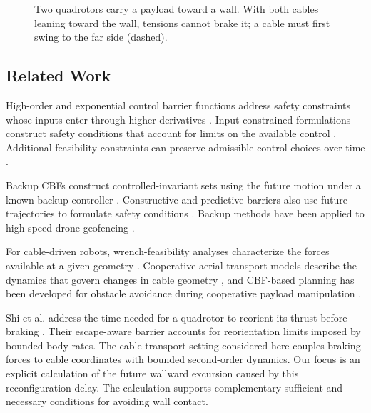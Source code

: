 \begin{figure}[t]
{%
}
\caption{Two quadrotors carry a payload toward a wall. With both cables leaning toward the wall, tensions cannot brake it; a cable must first swing to the far side (dashed).}
\vspace{-5pt}
\label{fig:scene}

\end{figure}

\subsection{Related Work}

High-order and exponential control barrier functions address safety constraints whose inputs enter through higher derivatives \cite{xiao2019control,xiao2022high,nguyen2016exponential}.  Input-constrained formulations construct safety conditions that account for limits on the available control \cite{breeden2021high}.  Additional feasibility constraints can preserve admissible control choices over time \cite{xiao2022sufficient}.

Backup CBFs construct controlled-invariant sets using the future motion under a known backup controller \cite{chen2021backup,gurriet2020scalable}.  Constructive and predictive barriers also use future trajectories to formulate safety conditions \cite{squires2018constructive,breeden2022predictive}.  Backup methods have been applied to high-speed drone geofencing \cite{singletary2022onboard}.

For cable-driven robots, wrench-feasibility analyses characterize the forces available at a given geometry \cite{gouttefarde2011interval,bouchard2010ability}.  Cooperative aerial-transport models describe the dynamics that govern changes in cable geometry \cite{sreenath2013dynamics,lee2018geometric}, and CBF-based planning has been developed for obstacle avoidance during cooperative payload manipulation \cite{pallar2025optimal}.

Shi et al. address the time needed for a quadrotor to reorient its thrust before braking \cite{shi2026escape}.  Their escape-aware barrier accounts for reorientation limits imposed by bounded body rates.  The cable-transport setting considered here couples braking forces to cable coordinates with bounded second-order dynamics.  Our focus is an explicit calculation of the future wallward excursion caused by this reconfiguration delay.  The calculation supports complementary sufficient and necessary conditions for avoiding wall contact.

